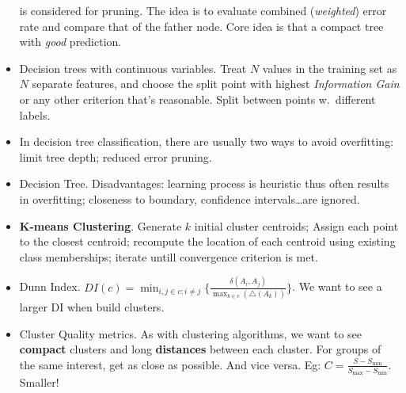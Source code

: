 \documentclass[twocolumn]{article}
\begin{document}
\begin{itemize}
  is considered for pruning. The idea is to evaluate combined
  (\emph{weighted}) error rate and compare that of the father
  node. Core idea is that a compact tree with \emph{good} prediction.
\item Decision trees with continuous variables. Treat $N$ values in
  the training set as $N$ separate features, and choose the split
  point with highest \emph{Information Gain} or any other criterion
  that's reasonable. Split between points w.\ different labels.
\item In decision tree classification, there are usually two ways to
  avoid overfitting: limit tree depth; reduced error pruning.
\item Decision Tree. Disadvantages: learning process is heuristic thus
  often results in overfitting; closeness to boundary, confidence
  intervals\ldots are ignored.
\item \textbf{K-means Clustering}. Generate $k$ initial cluster
  centroids; Assign each point to the closest centroid; recompute the
  location of each centroid using existing class memberships; iterate
  untill convergence criterion is met.
\item Dunn Index. $DI(c)=\min_{i,j\in c:i\neq j}\{\frac{\delta
    (A_{i},A_{j})}{\max_{k\in c}(\triangle (A_{k}))}\}$. We want to
  see a larger DI when build clusters.
\item Cluster Quality metrics. As with clustering algorithms, we want
  to see \textbf{compact} clusters and long \textbf{distances} between
  each cluster. For groups of the same interest, get as close as
  possible. And vice versa. Eg:
  $C=\frac{S-S_{\min}}{S_{\max}-S_{\min}}$. Smaller!
\end{itemize}
\end{document}
